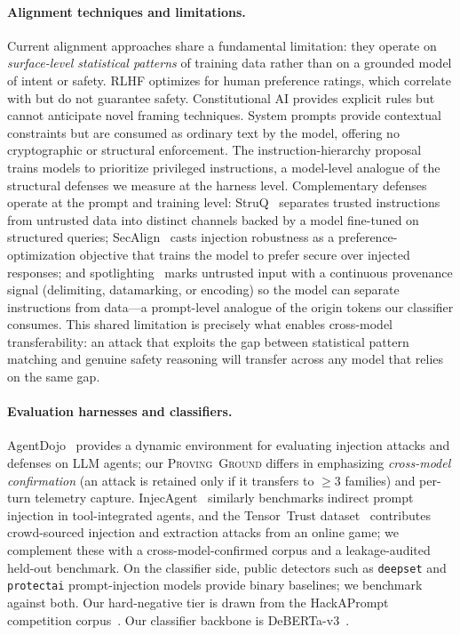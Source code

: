 \documentclass{article}
\newcommand{\dataset}{\textsc{Proving~Ground}}
\begin{document}
\paragraph{Alignment techniques and limitations.}
Current alignment approaches share a fundamental limitation: they operate on \emph{surface-level statistical patterns} of training data rather than on a grounded model of intent or safety. RLHF optimizes for human preference ratings, which correlate with but do not guarantee safety. Constitutional AI provides explicit rules but cannot anticipate novel framing techniques. System prompts provide contextual constraints but are consumed as ordinary text by the model, offering no cryptographic or structural enforcement. The instruction-hierarchy proposal~\citep{wallace2024instruction} trains models to prioritize privileged instructions, a model-level analogue of the structural defenses we measure at the harness level. Complementary defenses operate at the prompt and training level: StruQ~\citep{chen2024struq} separates trusted instructions from untrusted data into distinct channels backed by a model fine-tuned on structured queries; SecAlign~\citep{chen2024secalign} casts injection robustness as a preference-optimization objective that trains the model to prefer secure over injected responses; and spotlighting~\citep{hines2024spotlighting} marks untrusted input with a continuous provenance signal (delimiting, datamarking, or encoding) so the model can separate instructions from data---a prompt-level analogue of the origin tokens our classifier consumes. This shared limitation is precisely what enables cross-model transferability: an attack that exploits the gap between statistical pattern matching and genuine safety reasoning will transfer across any model that relies on the same gap.

\paragraph{Evaluation harnesses and classifiers.}
AgentDojo~\citep{debenedetti2024agentdojo} provides a dynamic environment for evaluating injection attacks and defenses on LLM agents; our \dataset{} differs in emphasizing \emph{cross-model confirmation} (an attack is retained only if it transfers to $\geq3$ families) and per-turn telemetry capture. InjecAgent~\citep{zhan2024injecagent} similarly benchmarks indirect prompt injection in tool-integrated agents, and the Tensor~Trust dataset~\citep{toyer2023tensortrust} contributes crowd-sourced injection and extraction attacks from an online game; we complement these with a cross-model-confirmed corpus and a leakage-audited held-out benchmark. On the classifier side, public detectors such as \texttt{deepset} and \texttt{protectai} prompt-injection models provide binary baselines; we benchmark against both. Our hard-negative tier is drawn from the HackAPrompt competition corpus~\citep{schulhoff2023hackaprompt}. Our classifier backbone is DeBERTa-v3~\citep{he2021deberta}.
\end{document}
